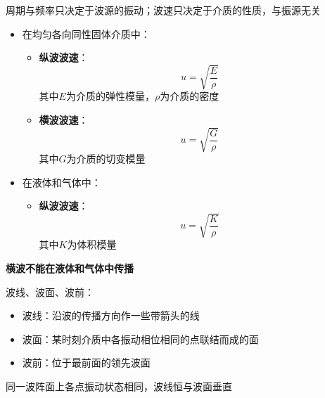\documentclass[12pt, a4paper, twoside]{ctexbook}
\begin{document}
周期与频率只决定于波源的振动；波速只决定于介质的性质，与振源无关

\begin{itemize}
    \item {\sonti 在均匀各向同性固体介质中}：
    \begin{itemize}
        \item \textbf{纵波波速}：
        $$
        u=\sqrt{\frac{E}{\rho}}
        $$
        其中$E$为介质的弹性模量，$\rho$为介质的密度
        \item \textbf{横波波速}：
        $$
        u=\sqrt{\frac{G}{\rho}}
        $$
        其中$G$为介质的切变模量
    \end{itemize}
    \item {\sonti 在液体和气体中}：
    \begin{itemize}
        \item \textbf{纵波波速}：
        $$
        u=\sqrt{\frac{K}{\rho}}
        $$
        其中$K$为体积模量
    \end{itemize}
\end{itemize}

\textbf{横波不能在液体和气体中传播}

{\sonti 波线、波面、波前}：
\begin{itemize}
    \item {\sonti 波线}：沿波的传播方向作一些带箭头的线
    \item {\sonti 波面}：某时刻介质中各振动相位相同的点联结而成的面
    \item {\sonti 波前}：位于最前面的领先波面
\end{itemize}

同一波阵面上各点振动状态相同，波线恒与波面垂直
\end{document}
